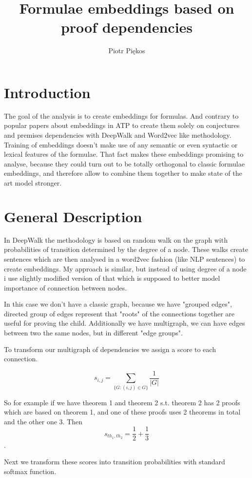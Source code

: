 \documentclass{article} %
\author{Piotr Piękos}
\title{%
Formulae embeddings based on proof dependencies}
\begin{document}
\maketitle

\section{Introduction}

The goal of the analysis is to create embeddings for formulas. And contrary to popular papers about embeddings in ATP to create them solely on conjectures and premises dependencies with DeepWalk\cite{DeepWalk} and Word2vec like methodology. Training of embeddings doesn't make use of any semantic or even syntactic or lexical features of the formulae. That fact makes these embeddings promising to analyse, because they could turn out to be totally orthogonal to classic formulae embeddings, and therefore allow to combine them together to make state of the art model stronger.
\section{General Description}

In DeepWalk\cite{DeepWalk} the methodology is based on random walk on the graph with probabilities of transition determined by the degree of a node. 
These walks create sentences which are then analysed in a word2vec fashion (like NLP sentences) to create embeddings. My approach is similar, but instead of using degree of a node i use slightly modified version of that which is supposed to better model importance of connection between nodes.

In this case we don't have a classic graph, because we have "grouped edges", directed group of edges represent that "roots" of the connections together are useful for proving the child. Additionally we have multigraph, we can have edges between two the same nodes, but in different "edge groups".

To transform our multigraph of dependencies we assign a score to each connection.

$$ s_{i,j} = \sum_{\{G: (i,j) \in G\}}\frac{1}{ |G|} $$  

So for example if we have theorem 1 and theorem 2 s.t. theorem 2 has 2 proofs which are based on theorem 1, and one of these proofs uses 2 theorems in total and the other one 3. Then $$s_{th_1, th_2} = \frac{1}{2} + \frac{1}{3} $$.

Next we transform these scores into transition probabilities with standard softmax function.
\end{document}
